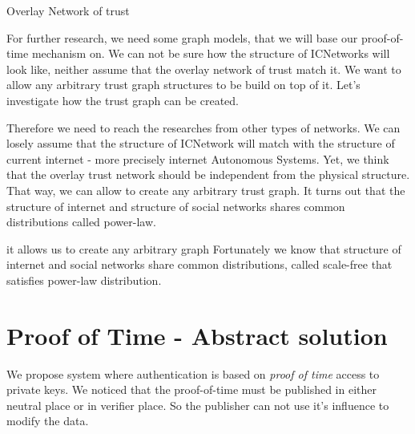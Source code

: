 \documentclass[nostrict]{szablonPG}
\begin{document}
Overlay Network of trust

For further research, we need some graph models, that we will base our proof-of-time mechanism on. We can not be sure how the structure of ICNetworks will look like, neither assume that the overlay network of trust match it. We want to allow any arbitrary trust graph structures to be build on top of it. Let's investigate how the trust graph can be created. 

Therefore we need to reach the researches from other types of networks. We can losely assume that the structure of ICNetwork will match with the structure of current internet - more precisely internet Autonomous Systems. Yet, we think that the overlay trust network should be independent from the physical structure.  That way, we can allow to create any arbitrary trust graph. It turns out that the structure of internet and structure of social networks shares common distributions called power-law. 

it allows us to create any arbitrary graph  Fortunately we know that structure of internet and social networks share common distributions, called scale-free that satisfies power-law distribution. 





\section{Proof of Time - Abstract solution}
We propose system where authentication is based on \textit{proof of time} access to private keys. 
We noticed that the proof-of-time must be published in either neutral place or in verifier place. So the publisher can not use it's influence to modify the data. 
\end{document}
